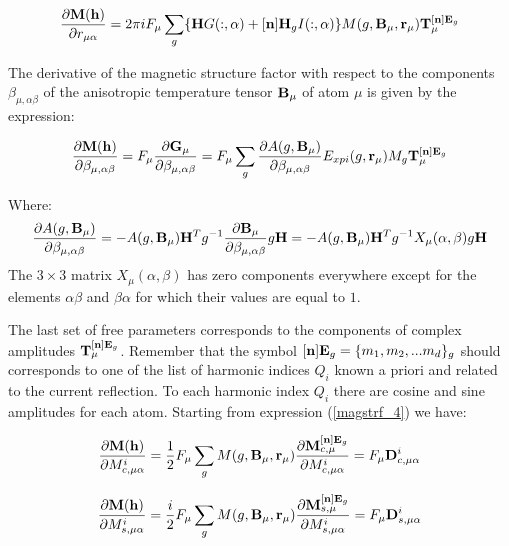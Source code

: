 \documentclass[10pt]{article}
\begin{document}
\begin{equation} \label{der_ralpha3}
\frac{\partial{\bf M}({\bf h})}{\partial r_{\mu\alpha}} =   2 \pi i  F_\mu \sum_g \{{\bf H}G(:,\alpha)  + [{\bf n}] {\bf H}_g I(:,\alpha)\}M(g,{\bf B}_\mu,{\bf r}_\mu)  {\bf T}_{\mu}^{[{\bf n}]{\bf E}_g} 
\end{equation}

The derivative of the magnetic structure factor with respect to the components $\beta_{\mu,\alpha \beta}$ of the anisotropic temperature tensor ${\bf B}_\mu$ of  atom $\mu$ is given by the expression:

\begin{equation} \label{der_aniso}
\frac{\partial{\bf M}({\bf h})}{\partial \beta_{\mu,\alpha \beta}}=  F_{\mu} \frac{\partial{\bf G}_\mu}{\partial  \beta_{\mu,\alpha \beta} }= F_{\mu} \sum_g \frac{\partial A(g,{\bf B}_\mu)}{\partial \beta_{\mu,\alpha \beta}} E_{xpi}(g,{\bf r}_\mu) M_g {\bf T}_{\mu}^{[{\bf n}]{\bf E}_g}    
\end{equation}

Where:
\begin{equation} \label{der_aniso2}
 \frac{\partial A(g,{\bf B}_\mu)}{\partial \beta_{\mu,\alpha \beta}} = - A(g,{\bf B}_\mu) {\bf H}^{T} g^{-1} \frac{\partial{\bf B}_\mu}{\partial \beta_{\mu,\alpha \beta}} g {\bf H}=- A(g,{\bf B}_\mu) {\bf H}^{T} g^{-1} X_\mu(\alpha,\beta) g {\bf H}
\end{equation}
The $3 \times 3$ matrix $X_\mu(\alpha,\beta)$ has zero components everywhere except for the elements $\alpha\beta$ and $\beta\alpha$ for which their values are equal to $1$.


The last set of free parameters corresponds to the components of complex amplitudes ${\bf T}_{\mu}^{[{\bf n}]{\bf E}_g}$. Remember that the symbol $[{\bf n}]{\bf E}_g = \{m_1,m_2,...m_d\}_g $ should corresponds to one of the list of harmonic indices $Q_i$ known a priori and related to the current reflection. To each harmonic index $Q_i$ there are cosine and sine amplitudes for each atom.  Starting from expression (\ref{magstrf_4}) we have:

\begin{equation} \label{der_mcos}
\frac{\partial{\bf M}({\bf h})}{\partial M_{c,\mu\alpha}^{i}}= \frac{1}{2} F_\mu \sum_g M(g,{\bf B}_\mu,{\bf r}_\mu) \frac{\partial {\bf M}_{c,\mu}^{[{\bf n}]{\bf E}_g}}{\partial M_{c,\mu\alpha}^{i}}=F_\mu {\bf D}_{c,\mu\alpha}^i
\end{equation}

\begin{equation} \label{der_msin}
\frac{\partial{\bf M}({\bf h})}{\partial M_{s,\mu\alpha}^{i}}= \frac{i}{2} F_\mu \sum_g M(g,{\bf B}_\mu,{\bf r}_\mu) \frac{\partial {\bf M}_{s,\mu}^{[{\bf n}]{\bf E}_g}}{\partial M_{s,\mu\alpha}^{i}}=F_\mu {\bf D}_{s,\mu\alpha}^i
\end{equation}
\end{document}
